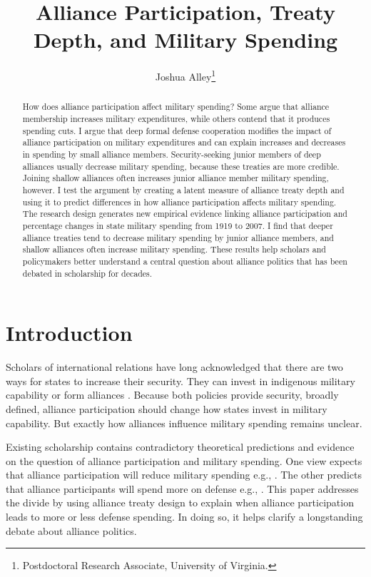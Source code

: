 \documentclass[12pt]{article}
\title{\textbf{Alliance Participation, Treaty Depth, and Military Spending}}
\author{Joshua Alley\footnote{Postdoctoral Research Associate, University of Virginia.}}
\date{}
\begin{document}
\maketitle 

\doublespace 

\begin{abstract}
How does alliance participation affect military spending? 
Some argue that alliance membership increases military expenditures, while others contend that it produces spending cuts.
I argue that deep formal defense cooperation modifies the impact of alliance participation on military expenditures and can explain increases and decreases in spending by small alliance members.  
Security-seeking junior members of deep alliances usually decrease military spending, because these treaties are more credible.
Joining shallow alliances often increases junior alliance member military spending, however.    
I test the argument by creating a latent measure of alliance treaty depth and using it to predict differences in how alliance participation affects military spending. 
The research design generates new empirical evidence linking alliance participation and percentage changes in state military spending from 1919 to 2007. 
I find that deeper alliance treaties tend to decrease military spending by junior alliance members, and shallow alliances often increase military spending.  
These results help scholars and policymakers better understand a central question about alliance politics that has been debated in scholarship for decades. 
\end{abstract}


\newpage 


\section{Introduction}


Scholars of international relations have long acknowledged that there are two ways for states to increase their security. 
They can invest in indigenous military capability or form alliances \citep{Morgenthau1948, Altfield1984, Morrow1993}.
Because both policies provide security, broadly defined, alliance participation should change how states invest in military capability. 
But exactly how alliances influence military spending remains unclear. 


Existing scholarship contains contradictory theoretical predictions and evidence on the question of alliance participation and military spending. 
One view expects that alliance participation will reduce military spending e.g., \citep{BarnettLevy1991, Morrow1993, Conybeare1994}. 
The other predicts that alliance participants will spend more on defense e.g., \citep{Diehl1994, MorganPalmer2006, QuirozFlores2011}.
This paper addresses the divide by using alliance treaty design to explain when alliance participation leads to more or less defense spending. 
In doing so, it helps clarify a longstanding debate about alliance politics.
\end{document}
